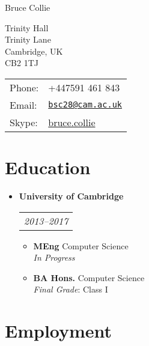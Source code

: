 \documentclass[letterpaper]{article}
\def\name{Bruce Collie}
\begin{document}
{\huge \name}


\vspace{0.25in}

\begin{minipage}{0.45\linewidth}
  Trinity Hall \\
  Trinity Lane \\
  Cambridge, UK \\
  CB2 1TJ
\end{minipage}
\begin{minipage}{0.45\linewidth}
  \begin{tabular}{ll}
    Phone: & +447591 461 843 \\
    Email: & \href{mailto:bsc28@cam.ac.uk}{\tt bsc28@cam.ac.uk} \\
    Skype: & \href{skype:bruce.collie}{bruce.collie}
  \end{tabular}
\end{minipage}

\section*{Education}

\begin{itemize}
    \item \textbf{University of Cambridge} \\
        \begin{tabular}{c}
            \emph{2013--2017}
        \end{tabular}
        \begin{itemize}
            \item \textbf{MEng} Computer Science \\
              \emph{In Progress}
            \item \textbf{BA Hons.} Computer Science \\
                \emph{Final Grade}: Class I
        \end{itemize}
\end{itemize}

\section*{Employment}
\end{document}
